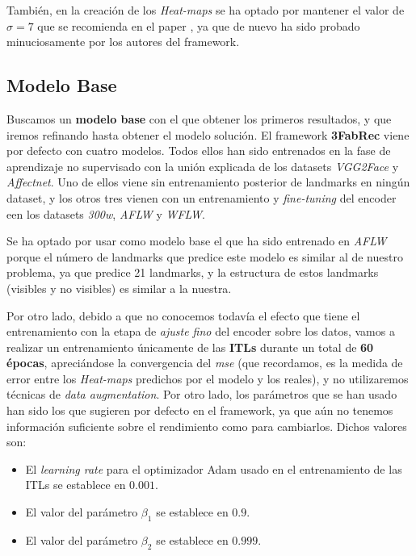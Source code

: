         \medskip

        \noindent También, en la creación de los \textit{Heat-maps} se ha optado por mantener el valor de $\sigma =7$ que se recomienda en el paper \cite{browatzki20203fabrec}, ya que de nuevo ha sido probado minuciosamente por los autores del framework.
    
    \subsection{Modelo Base}
        \noindent Buscamos un \textbf{modelo base} con el que obtener los primeros resultados, y que iremos refinando hasta obtener el modelo solución. El framework \textbf{3FabRec} viene por defecto con cuatro modelos. Todos ellos han sido entrenados en la fase de aprendizaje no supervisado con la unión explicada de los datasets \textit{VGG2Face} y \textit{Affectnet}. Uno de ellos viene sin entrenamiento posterior de landmarks en ningún dataset, y los otros tres vienen con un entrenamiento y \textit{fine-tuning} del encoder een los datasets \textit{300w}, \textit{AFLW} y \textit{WFLW}.

        \medskip

        \noindent Se ha optado por usar como modelo base el que ha sido entrenado en \textit{AFLW} porque el número de landmarks que predice este modelo es similar al de nuestro problema, ya que predice 21 landmarks, y la estructura de estos landmarks (visibles y no visibles) es similar a la nuestra.

        \medskip

        \noindent Por otro lado, debido a que no conocemos todavía el efecto que tiene el entrenamiento con la etapa de \textit{ajuste fino} del encoder sobre los datos, vamos a realizar un entrenamiento únicamente de las \textbf{ITLs} durante un total de \textbf{60 épocas}, apreciándose la convergencia del \textit{mse} (que recordamos, es la medida de error entre los \textit{Heat-maps} predichos por el modelo y los reales), y no utilizaremos técnicas de \textit{data augmentation}. Por otro lado, los parámetros que se han usado han sido los que sugieren por defecto en el framework, ya que aún no tenemos información suficiente sobre el rendimiento como para cambiarlos. Dichos valores son: 

        \begin{itemize}
            \item El \textit{learning rate} para el optimizador Adam usado en el entrenamiento de las ITLs se establece en $0.001$. 
            \item El valor del parámetro $\beta_1$ se establece en $0.9$.
            \item El valor del parámetro $\beta_2$ se establece en $0.999$.
        \end{itemize}

